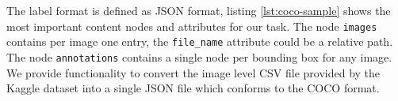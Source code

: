 The label format is defined as JSON format, listing \ref{lst:coco-sample} shows the most important content nodes and attributes for our task.
The node \texttt{images} contains per image one entry, the \texttt{file\_name} attribute could be a relative path. The node \texttt{annotations} contains a single node per bounding box for any image.
We provide functionality to convert the image level CSV file provided by the Kaggle dataset into a single JSON file which conforms to the \ac{COCO} format.

